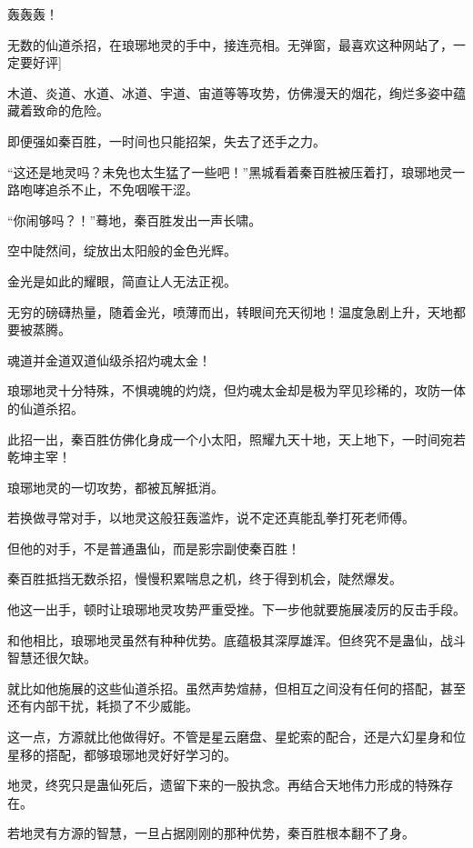 
\begin{this_body}



轰轰轰！

无数的仙道杀招，在琅琊地灵的手中，接连亮相。无弹窗，最喜欢这种网站了，一定要好评]

木道、炎道、水道、冰道、宇道、宙道等等攻势，仿佛漫天的烟花，绚烂多姿中蕴藏着致命的危险。

即便强如秦百胜，一时间也只能招架，失去了还手之力。

“这还是地灵吗？未免也太生猛了一些吧！”黑城看着秦百胜被压着打，琅琊地灵一路咆哮追杀不止，不免咽喉干涩。

“你闹够吗？！”蓦地，秦百胜发出一声长啸。

空中陡然间，绽放出太阳般的金色光辉。

金光是如此的耀眼，简直让人无法正视。

无穷的磅礴热量，随着金光，喷薄而出，转眼间充天彻地！温度急剧上升，天地都要被蒸腾。

魂道并金道双道仙级杀招灼魂太金！

琅琊地灵十分特殊，不惧魂魄的灼烧，但灼魂太金却是极为罕见珍稀的，攻防一体的仙道杀招。

此招一出，秦百胜仿佛化身成一个小太阳，照耀九天十地，天上地下，一时间宛若乾坤主宰！

琅琊地灵的一切攻势，都被瓦解抵消。

若换做寻常对手，以地灵这般狂轰滥炸，说不定还真能乱拳打死老师傅。

但他的对手，不是普通蛊仙，而是影宗副使秦百胜！

秦百胜抵挡无数杀招，慢慢积累喘息之机，终于得到机会，陡然爆发。

他这一出手，顿时让琅琊地灵攻势严重受挫。下一步他就要施展凌厉的反击手段。

和他相比，琅琊地灵虽然有种种优势。底蕴极其深厚雄浑。但终究不是蛊仙，战斗智慧还很欠缺。

就比如他施展的这些仙道杀招。虽然声势煊赫，但相互之间没有任何的搭配，甚至还有内部干扰，耗损了不少威能。

这一点，方源就比他做得好。不管是星云磨盘、星蛇索的配合，还是六幻星身和位星移的搭配，都够琅琊地灵好好学习的。

地灵，终究只是蛊仙死后，遗留下来的一股执念。再结合天地伟力形成的特殊存在。

若地灵有方源的智慧，一旦占据刚刚的那种优势，秦百胜根本翻不了身。


\end{this_body}
